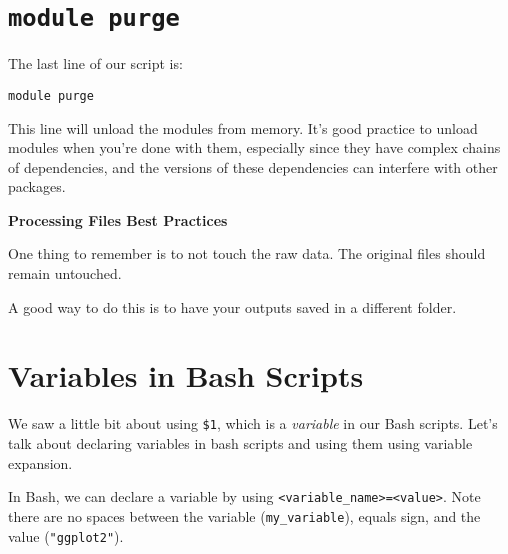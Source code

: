 \documentclass[
  letterpaper,
  DIV=11,
  numbers=noendperiod]{scrreprt}
\newenvironment{Shaded}{\begin{snugshade}}{\end{snugshade}}
\newcommand{\BuiltInTok}[1]{\textcolor[rgb]{0.00,0.23,0.31}{#1}}
\newcommand{\OperatorTok}[1]{\textcolor[rgb]{0.37,0.37,0.37}{#1}}
\newcommand{\StringTok}[1]{\textcolor[rgb]{0.13,0.47,0.30}{#1}}
\newcommand{\VariableTok}[1]{\textcolor[rgb]{0.07,0.07,0.07}{#1}}
\begin{document}
\section{\texorpdfstring{\texttt{module\ purge}}{module purge}}\label{module-purge}

The last line of our script is:

\begin{verbatim}
module purge
\end{verbatim}

This line will unload the modules from memory. It's good practice to
unload modules when you're done with them, especially since they have
complex chains of dependencies, and the versions of these dependencies
can interfere with other packages.

\begin{tcolorbox}[enhanced jigsaw, breakable, leftrule=.75mm, colframe=quarto-callout-color-frame, left=2mm, toprule=.15mm, arc=.35mm, rightrule=.15mm, opacityback=0, bottomrule=.15mm, colback=white]

\vspace{-3mm}\textbf{Processing Files Best Practices}\vspace{3mm}

One thing to remember is to not touch the raw data. The original files
should remain untouched.

A good way to do this is to have your outputs saved in a different
folder.

\end{tcolorbox}

\section{Variables in Bash Scripts}\label{sec-bash-variables}

We saw a little bit about using \texttt{\$1}, which is a \emph{variable}
in our Bash scripts. Let's talk about declaring variables in bash
scripts and using them using variable expansion.

In Bash, we can declare a variable by using
\texttt{\textless{}variable\_name\textgreater{}=\textless{}value\textgreater{}}.
Note there are no spaces between the variable (\texttt{my\_variable}),
equals sign, and the value (\texttt{"ggplot2"}).

\begin{Shaded}
\end{Shaded}
\end{document}
